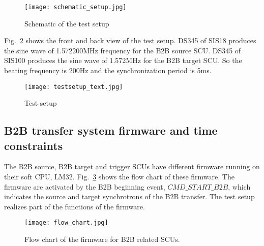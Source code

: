 \begin{figure}[!htb]
   \centering   
   \texttt{[image: schematic\_setup.jpg]}
   \caption{Schematic of the test setup}
   \label{setup}
\end{figure}

Fig.~\ref{testsetup_text} shows the front and back view of the test setup. DS345 of SIS18 produces the sine wave of 1.572200MHz frequency for the B2B source SCU. DS345 of SIS100 produces the sine wave of 1.572MHz for the B2B target SCU. So the beating frequency is 200Hz and the synchronization period is 5ms. 

\begin{figure}[!htb]
   \centering   
   \texttt{[image: testsetup\_text.jpg]}
   \caption{Test setup}
   \label{testsetup_text}
\end{figure}

\subsection{B2B transfer system firmware and time constraints}

The B2B source, B2B target and trigger SCUs have different firmware running on their soft CPU, LM32. Fig.~\ref{flow_chart} shows the flow chart of these firmware. The firmware are activated by the B2B beginning event, $CMD\_START\_B2B$, which indicates the source and target synchrotrons of the B2B transfer. The test setup realizes part of the functions of the firmware.
\begin{figure}[!htb]
   \centering   
   \texttt{[image: flow\_chart.jpg]}
   \caption{Flow chart of the firmware for B2B related SCUs.}
   \label{flow_chart}
\end{figure}

